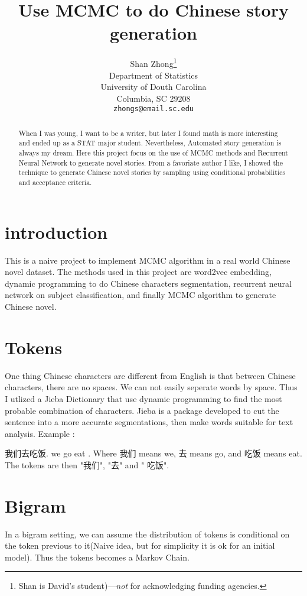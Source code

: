 \documentclass{article}
\title{Use MCMC to do Chinese story generation}
\author{
  Shan Zhong\thanks{Shan is David's student)---\emph{not} for acknowledging funding agencies.} \\
  Department of Statistics\\
  University of Douth Carolina\\
  Columbia, SC 29208\\
  \texttt{zhongs@email.sc.edu} \\
}
\begin{document}
\maketitle

\begin{abstract}
When I was young, I want to be a writer, but later I found math is more interesting and ended up as a STAT major student. Nevertheless, Automated story generation is always my dream. Here this project focus on the use of MCMC methods and Recurrent Neural Network to generate novel stories.  From a favoriate author I like, I showed the technique to generate Chinese novel stories by sampling using conditional probabilities and acceptance criteria.

\end{abstract}

\section{introduction}
This is a naive project to implement MCMC algorithm in a real world Chinese novel dataset.  The methods used in this project are word2vec embedding, dynamic programming to do Chinese characters segmentation, recurrent neural network on subject classification, and finally MCMC algorithm to generate Chinese novel.

\section{Tokens}
One thing Chinese characters are different from English is that between Chinese characters, there are no spaces. We can not easily seperate words by space. Thus I utlized a Jieba Dictionary that use dynamic programming to find the most probable combination of characters.\cite{jieba} Jieba is  a package developed to cut the sentence into a more accurate segmentations, then make words suitable for text analysis.
Example : 

我们去吃饭.  we go eat . Where 我们 means we, 去 means go, and 吃饭 means eat. The tokens are then "我们", "去" and " 吃饭".

\section{Bigram}
In a bigram setting, we can assume the distribution of tokens is conditional on the token previous to it(Naive idea, but for simplicity it is ok for an initial model). Thus the tokens becomes a Markov Chain. 
\end{document}
